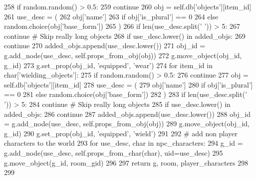 \begin{DoxyCode}
258                 \textcolor{keywordflow}{if} random.random() > 0.5:
259                     \textcolor{keywordflow}{continue}
260                 obj = self.db[\textcolor{stringliteral}{'objects'}][item\_id]
261                 use\_desc = (
262                     obj[\textcolor{stringliteral}{'name'}]
263                     \textcolor{keywordflow}{if} obj[\textcolor{stringliteral}{'is\_plural'}] == 0
264                     \textcolor{keywordflow}{else} random.choice(obj[\textcolor{stringliteral}{'base\_form'}])
265                 )
266                 \textcolor{keywordflow}{if} len(use\_desc.split(\textcolor{stringliteral}{' '})) > 5:
267                     \textcolor{keywordflow}{continue}  \textcolor{comment}{# Skip really long objects}
268                 \textcolor{keywordflow}{if} use\_desc.lower() \textcolor{keywordflow}{in} added\_objs:
269                     \textcolor{keywordflow}{continue}
270                 added\_objs.append(use\_desc.lower())
271                 obj\_id = g.add\_node(use\_desc, self.props\_from\_obj(obj))
272                 g.move\_object(obj\_id, g\_id)
273                 g.set\_prop(obj\_id, \textcolor{stringliteral}{'equipped'}, \textcolor{stringliteral}{'wear'})
274             \textcolor{keywordflow}{for} item\_id \textcolor{keywordflow}{in} char[\textcolor{stringliteral}{'wielding\_objects'}]:
275                 \textcolor{keywordflow}{if} random.random() > 0.5:
276                     \textcolor{keywordflow}{continue}
277                 obj = self.db[\textcolor{stringliteral}{'objects'}][item\_id]
278                 use\_desc = (
279                     obj[\textcolor{stringliteral}{'name'}]
280                     \textcolor{keywordflow}{if} obj[\textcolor{stringliteral}{'is\_plural'}] == 0
281                     \textcolor{keywordflow}{else} random.choice(obj[\textcolor{stringliteral}{'base\_form'}])
282                 )
283                 \textcolor{keywordflow}{if} len(use\_desc.split(\textcolor{stringliteral}{' '})) > 5:
284                     \textcolor{keywordflow}{continue}  \textcolor{comment}{# Skip really long objects}
285                 \textcolor{keywordflow}{if} use\_desc.lower() \textcolor{keywordflow}{in} added\_objs:
286                     \textcolor{keywordflow}{continue}
287                 added\_objs.append(use\_desc.lower())
288                 obj\_id = g.add\_node(use\_desc, self.props\_from\_obj(obj))
289                 g.move\_object(obj\_id, g\_id)
290                 g.set\_prop(obj\_id, \textcolor{stringliteral}{'equipped'}, \textcolor{stringliteral}{'wield'})
291 
292         \textcolor{comment}{# add non player characters to the world}
293         \textcolor{keywordflow}{for} use\_desc, char \textcolor{keywordflow}{in} npc\_characters:
294             g\_id = g.add\_node(use\_desc, self.props\_from\_char(char), uid=use\_desc)
295             g.move\_object(g\_id, room\_gid)
296 
297         \textcolor{keywordflow}{return} g, room, player\_characters
298 
299 
\end{DoxyCode}
